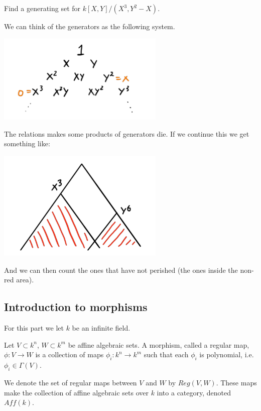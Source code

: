 \begin{example}
Find a generating set for $k[X, Y]/(X^3, Y^2-X)$.
\end{example}
We can think of the generators as the following system. 
\begin{center}
\includegraphics[width=8cm]{img/lecture_5/system1.png}
\end{center}
The relations makes some products of generators die. If we continue this we get something like:
\begin{center}
\includegraphics[width=8cm]{img/lecture_5/system2.png}
\end{center}
And we can then count the ones that have not perished (the ones inside the non-red area). 

\subsection{Introduction to morphisms}

For this part we let $k$ be an infinite field. 

\begin{definition}
Let $V\subset k^n$, $W\subset k^m$ be affine algebraic sets. A morphism, called a regular map, $\phi:V\longrightarrow W$ is a collection of maps $\phi_i:k^n\longrightarrow k^m$ such that each $\phi_i$ is polynomial, i.e. $\phi_i\in\Gamma(V)$. 
\end{definition}

We denote the set of regular maps between $V$ and $W$ by $Reg(V, W)$. These maps make the collection of affine algebraic sets over $k$ into a category, denoted $Aff(k)$. 

